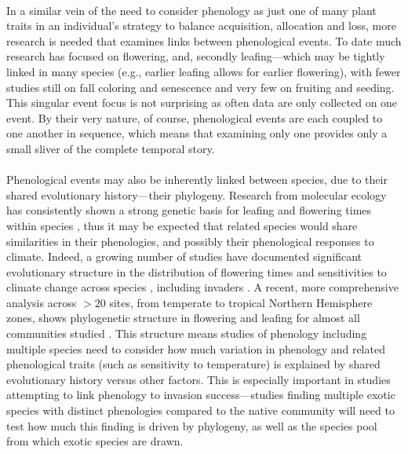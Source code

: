 \documentclass[11pt,a4paper,oneside]{article}
\begin{document}
\\
In a similar vein of the need to consider phenology as just one of many plant traits in an individual's strategy to balance acquisition, allocation and loss, more research is needed that examines links between phenological events. To date much research has focused on flowering, and, secondly leafing---which may be tightly linked in many species (e.g., earlier leafing allows for earlier flowering), with fewer studies still on fall coloring and senescence and very few on fruiting and seeding. This singular event focus is not surprising as often data are only collected on one event. By their very nature, of course, phenological events are each coupled to one another in sequence, which means that examining only one provides only a small sliver of the complete temporal story. \\
\\
Phenological events may also be inherently linked between species, due to their shared evolutionary history---their phylogeny. Research from molecular ecology has consistently shown a strong genetic basis for leafing and flowering times within species \citep{Howe:2003,arabid2011}, thus it may be expected that related species would share similarities in their phenologies, and possibly their phenological responses to climate. Indeed, a growing number of studies have documented significant evolutionary structure in the distribution of flowering times and sensitivities to climate change across species \citep{Willis:2008bf,Davis:2010ls}, including invaders \citep{Willis:2010al,wolkovichAmBot2013}. A recent, more comprehensive analysis across \(>20\) sites, from temperate to tropical Northern Hemisphere zones, shows phylogenetic structure in flowering and leafing for almost all communities studied \citep{phenophylo}. This structure means studies of phenology including multiple species need to consider how much variation in phenology and related phenological traits (such as sensitivity to temperature) is explained by shared evolutionary history versus other factors. This is especially important in studies attempting to link phenology to invasion success---studies finding multiple exotic species with distinct phenologies compared to the native community will need to test how much this finding is driven by phylogeny, as well as the species pool from which exotic species are drawn.\\
\end{document}
